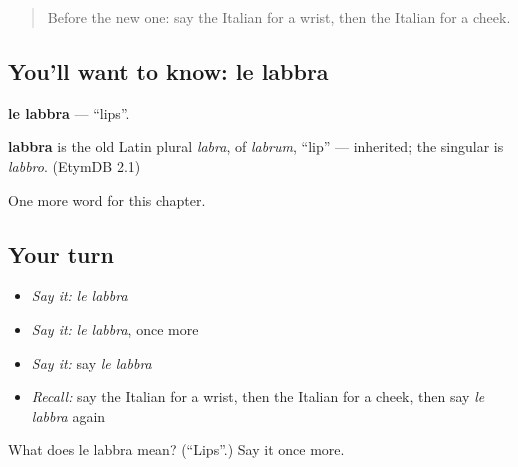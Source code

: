 \label{lesson:IT-C122-labbra}



\begin{quote}
Before the new one: say the Italian for a wrist, then the Italian for a cheek.
\end{quote}

\subsection*{You'll want to know: le labbra}
\textbf{le labbra} — \textquotedblleft{}lips\textquotedblright{}.

\begin{cousinweb}
\textbf{labbra} is the old Latin plural \emph{labra}, of \emph{labrum}, \textquotedblleft{}lip\textquotedblright{} — inherited; the singular is \emph{labbro}. (EtymDB 2.1)
\end{cousinweb}

\begin{grammarlens}[title={What you've built}]
One more word for this chapter.
\end{grammarlens}

\subsection*{Your turn}
\begin{itemize}
\raggedright
  \item \emph{Say it:} \emph{le labbra}
  \item \emph{Say it:} \emph{le labbra}, once more
  \item \emph{Say it:} say \emph{le labbra}
  \item \emph{Recall:} say the Italian for a wrist, then the Italian for a cheek, then say \emph{le labbra} again
\end{itemize}

\begin{tcolorbox}[breakable,colback=teal!4,colframe=teal!35!black,title={Before you move on}]
What does le labbra mean? (\textquotedblleft{}Lips\textquotedblright{}.) Say it once more.
\end{tcolorbox}

